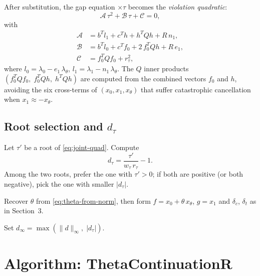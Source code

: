 \documentclass{article}
\begin{document}
After substitution, the gap equation $\times\tau$ becomes the
\emph{violation quadratic}:
\begin{equation}\label{eq:joint-quad}
  \boxed{\mathcal{A}\,\tau^2 + \mathcal{B}\,\tau + \mathcal{C} = 0,}
\end{equation}
with
\begin{align}
  \mathcal{A} &= b^T l_1 + c^T h + h^T Q h + R\,n_1, \label{eq:Acoeff}\\
  \mathcal{B} &= b^T l_0 + c^T f_0 + 2\,f_0^T Q h + R\,e_1, \label{eq:Bcoeff}\\
  \mathcal{C} &= f_0^T Q f_0 + r_\tau^2, \label{eq:Ccoeff}
\end{align}
where $l_0 = \lambda_0 - e_1\,\lambda_\theta$,
$l_1 = \lambda_1 - n_1\,\lambda_\theta$.
The $Q$ inner products $(f_0^T Q f_0,\; f_0^T Q h,\; h^T Q h)$
are computed from the combined vectors $f_0$ and $h$, avoiding
the six cross-terms of $(x_0, x_1, x_\theta)$ that suffer
catastrophic cancellation when $x_1 \approx -x_\theta$.

\subsection{Root selection and $d_\tau$}

Let $\tau'$ be a root of \eqref{eq:joint-quad}.  Compute
\begin{equation}\label{eq:dtau}
  d_\tau = \frac{\tau'}{w_\tau\,r_\tau} - 1.
\end{equation}
Among the two roots, prefer the one with $\tau' > 0$;
if both are positive (or both negative), pick the one with
smaller $|d_\tau|$.

Recover $\theta$ from \eqref{eq:theta-from-norm}, then form
$f = x_0 + \theta\,x_\theta$, $g = x_1$ and
$\delta_c$, $\delta_t$ as in Section~3.

Set $d_\infty = \max(\|d\|_\infty,\; |d_\tau|)$.

\section{Algorithm: ThetaContinuationR}
\end{document}
